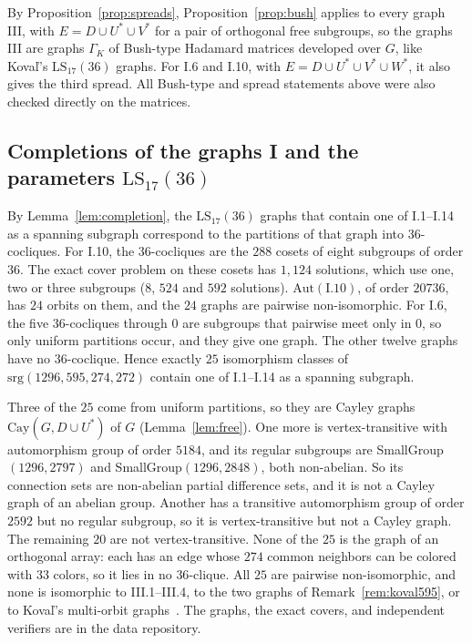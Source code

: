 \documentclass[11pt]{amsart}
\theoremstyle{definition}
\newcommand{\srg}{\mathrm{srg}}
\newcommand{\Cay}{\mathrm{Cay}}
\newcommand{\LS}{\mathrm{LS}}
\begin{document}
By Proposition~\ref{prop:spreads}, Proposition~\ref{prop:bush} applies to every graph III, with $E=D\cup U^*\cup V^*$ for a pair of orthogonal free subgroups, so the graphs III are graphs $\Gamma_K$ of Bush-type Hadamard matrices developed over $G$, like Kova\v{l}'s $\LS_{17}(36)$ graphs. For I.6 and I.10, with $E=D\cup U^*\cup V^*\cup W^*$, it also gives the third spread. All Bush-type and spread statements above were also checked directly on the matrices.

\subsection{Completions of the graphs I and the parameters \texorpdfstring{$\LS_{17}(36)$}{LS17(36)}}\label{sec:completions}

By Lemma~\ref{lem:completion}, the $\LS_{17}(36)$ graphs that contain one of I.1--I.14 as a spanning subgraph correspond to the partitions of that graph into $36$-cocliques. For I.10, the $36$-cocliques are the $288$ cosets of eight subgroups of order $36$. The exact cover problem on these cosets has $1{,}124$ solutions, which use one, two or three subgroups ($8$, $524$ and $592$ solutions). $\mathrm{Aut}(\mathrm{I}.10)$, of order $20736$, has $24$ orbits on them, and the $24$ graphs are pairwise non-isomorphic. For I.6, the five $36$-cocliques through $0$ are subgroups that pairwise meet only in $0$, so only uniform partitions occur, and they give one graph. The other twelve graphs have no $36$-coclique. Hence exactly $25$ isomorphism classes of $\srg(1296,595,274,272)$ contain one of I.1--I.14 as a spanning subgraph.

Three of the $25$ come from uniform partitions, so they are Cayley graphs $\Cay(G,D\cup U^*)$ of $G$ (Lemma~\ref{lem:free}). One more is vertex-transitive with automorphism group of order $5184$, and its regular subgroups are SmallGroup$(1296,2797)$ and SmallGroup$(1296,2848)$, both non-abelian. So its connection sets are non-abelian partial difference sets, and it is not a Cayley graph of an abelian group. Another has a transitive automorphism group of order $2592$ but no regular subgroup, so it is vertex-transitive but not a Cayley graph. The remaining $20$ are not vertex-transitive. None of the $25$ is the graph of an orthogonal array: each has an edge whose $274$ common neighbors can be colored with $33$ colors, so it lies in no $36$-clique. All $25$ are pairwise non-isomorphic, and none is isomorphic to III.1--III.4, to the two graphs of Remark~\ref{rem:koval595}, or to Kova\v{l}'s multi-orbit graphs~\cite{KovalMultiOrbit}. The graphs, the exact covers, and independent verifiers are in the data repository.
\end{document}
